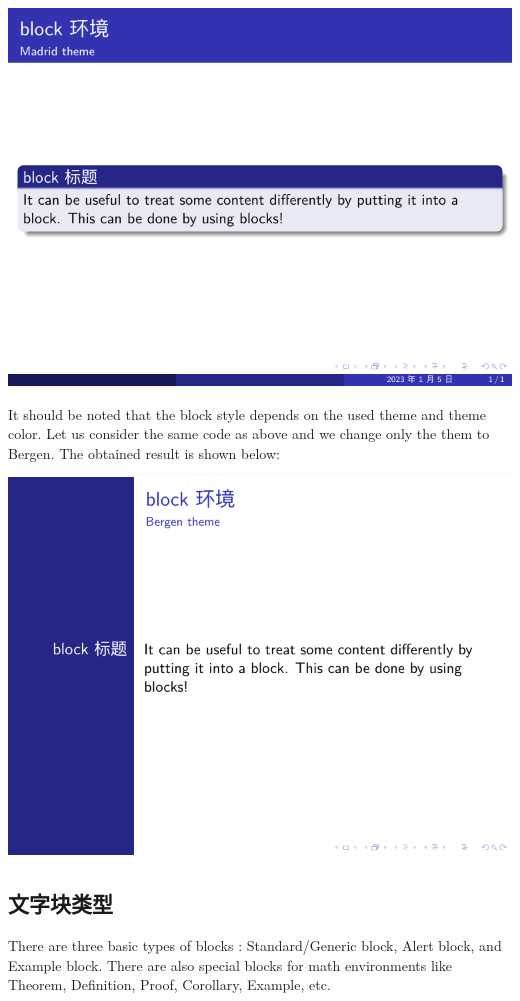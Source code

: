 \includegraphics{examples/beamer/beamerblock01.pdf}

It should be noted that the block style depends on the used theme and theme color. Let us consider the same code as above and we change only the them to {\ttfamily Bergen}. The obtained result is shown below:

\includegraphics{examples/beamer/beamerblock02.pdf}

\subsection{文字块类型}

There are three basic types of blocks : Standard/Generic block, Alert block, and Example block. There are also special blocks for math environments like Theorem, Definition, Proof, Corollary, Example, etc.

